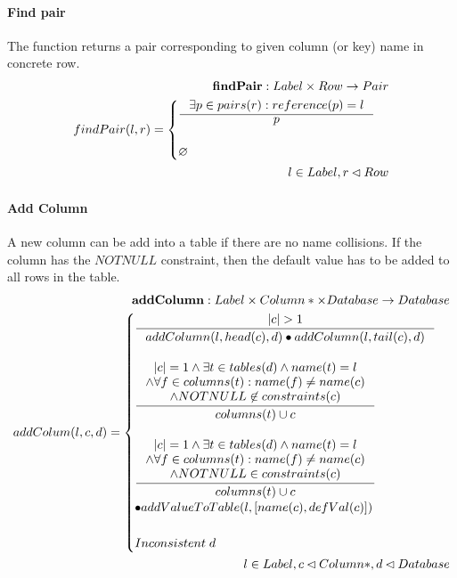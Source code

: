 \documentclass[11pt]{article}
\begin{document}
\paragraph{Find pair} The function returns a pair corresponding to given column (or key) name in concrete row.
\begin{align*}
\mathbf{findPair} : Label \times Row \rightarrow Pair \\
	findPair(l, r) = \begin{cases}
		\inference{\exists p \in pairs(r) : reference(p) = l}{p} \\ \\
			\varnothing
		\end{cases}\\
		l \in Label, r \lhd Row
\end{align*}

\paragraph{Add Column} A new column can be add into a table if there are no name collisions. If the column has the $NOTNULL$ constraint, then the default value has to be added to all rows in the table.
\begin{align*}
	\mathbf{addColumn} : Label \times Column* \times Database \rightarrow Database \\ 	
	addColum(l, c, d) = \begin{cases}
		\inference{|c| > 1}{addColumn(l, head(c), d) \bullet addColumn(l, tail(c), d)} \\ \\
		\inference{|c| = 1 \wedge \exists t \in tables(d) \wedge name(t) = l \\ \wedge \forall f \in columns(t) : name(f) \neq name(c) \\ \wedge NOTNULL \not \in constraints(c) }{columns(t) \cup c}\\ \\
		\inference{|c| = 1 \wedge \exists t \in tables(d) \wedge name(t) = l \\ \wedge \forall f \in columns(t) : name(f) \neq name(c) \\ \wedge NOTNULL \in constraints(c) }{columns(t) \cup c}\\ \bullet addValueToTable(l, [name(c), defVal(c)]) \\ \\
		Inconsistent \;d 
	 \end{cases}\\ 
	 l \in Label, c \lhd Column*,d \lhd Database
\end{align*}
\end{document}
